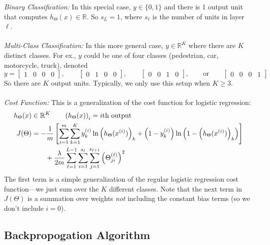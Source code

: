 \documentclass[12pt]{article}
\begin{document}
{\sl Binary Classification:} In this special case, $y \in \{ 0, 1\}$
and there is 1 output unit that computes $h_\Theta(x) \in \mathbb{R}$.
So $s_L = 1$, where $s_\ell$ is the number of units in layer $\ell$.
\\
\\
{\sl Multi-Class Classification:} In this more general case, 
$y\in \mathbb{R}^K$ where there are $K$ distinct classes. 
For ex., $y$ could be one of four classes (pedestrian,
car, motorcycle, truck), denoted
\[ y = \begin{bmatrix} 1 & 0 & 0 & 0 \end{bmatrix}, \qquad 
   \begin{bmatrix} 0 & 1 & 0 & 0 \end{bmatrix}, \qquad
   \begin{bmatrix} 0 & 0 & 1 & 0 \end{bmatrix}, \qquad\text{or}\qquad
   \begin{bmatrix} 0 & 0 & 0 & 1 \end{bmatrix} \]
So there are $K$ output units. Typically, we only use this setup
when $K\geq 3$.
\\
\\
{\sl Cost Function:}
This is a generalization of the cost function for
logistic regression:
\begin{align}
   h_\Theta(x) &\in \mathbb{R}^K \qquad \left(h_\Theta(x)\right)_i = 
   \text{$i$th output} \notag\\
   J(\Theta) &= -\frac{1}{m} \left[\sum^m_{i=1}\sum^K_{k=1} y_k^{(i)} 
   \ln \left(h_\Theta(x^{(i)})\right)_k + \left(1-y_k^{(i)}\right)
   \ln \left(1-\left(h_\Theta(x^{(i)})\right)_k\right)
   \right] \notag\\
   &\qquad + \frac{\lambda}{2m} \sum^{L-1}_{\ell=1} \sum^{s_\ell}_{i=1}
   \sum^{s_{\ell+1}}_{j=1} \left(\Theta^{(\ell)}_{ji}\right)^2
\end{align}
The first term is a simple generalization of the regular
logistic regression cost function---we just sum over the $K$ different 
classes. Note that the next term in $J(\Theta)$ is a summation over 
weights \emph{not} including the constant bias terms (so we don't
include $i=0$).

\newpage
\subsection{Backpropogation Algorithm}
\end{document}
